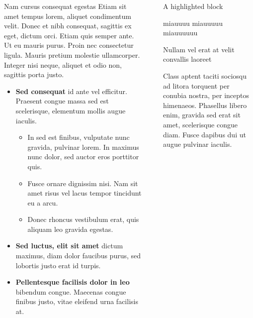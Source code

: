 \documentclass[final]{beamer}
\newlength{\sepwidth}
\newlength{\colwidth}
\newcommand{\separatorcolumn}{\begin{column}{\sepwidth}\end{column}}
\begin{document}
\begin{frame}[t]
\begin{columns}[t]
\begin{column}{\colwidth}
\begin{block}{Nam cursus consequat egestas}
					Etiam sit amet tempus lorem, aliquet condimentum velit. Donec et nibh
					consequat, sagittis ex eget, dictum orci. Etiam quis semper ante. Ut eu
					mauris purus. Proin nec consectetur ligula. Mauris pretium molestie
					ullamcorper. Integer nisi neque, aliquet et odio non, sagittis porta justo.
					
					\begin{itemize}
						\item \textbf{Sed consequat} id ante vel efficitur. Praesent congue massa
						sed est scelerisque, elementum mollis augue iaculis.
						\begin{itemize}
							\item In sed est finibus, vulputate
							nunc gravida, pulvinar lorem. In maximus nunc dolor, sed auctor eros
							porttitor quis.
							\item Fusce ornare dignissim nisi. Nam sit amet risus vel lacus
							tempor tincidunt eu a arcu.
							\item Donec rhoncus vestibulum erat, quis aliquam leo
							gravida egestas.
						\end{itemize}
						\item \textbf{Sed luctus, elit sit amet} dictum maximus, diam dolor
						faucibus purus, sed lobortis justo erat id turpis.
						\item \textbf{Pellentesque facilisis dolor in leo} bibendum congue.
						Maecenas congue finibus justo, vitae eleifend urna facilisis at.
					\end{itemize}
					
				\end{block}
				
			\end{column}
			
			\separatorcolumn
			
			\begin{column}{\colwidth}
				
				\begin{exampleblock}{A highlighted block}
					
				miauuuu miauuuuu miauuuuuu
					
				\end{exampleblock}
				
				\begin{block}{Nullam vel erat at velit convallis laoreet}
					
					Class aptent taciti sociosqu ad litora torquent per conubia nostra, per
					inceptos himenaeos. Phasellus libero enim, gravida sed erat sit amet,
					scelerisque congue diam. Fusce dapibus dui ut augue pulvinar iaculis.
					

\end{block}
\end{column}
\end{columns}
\end{frame}
\end{document}
